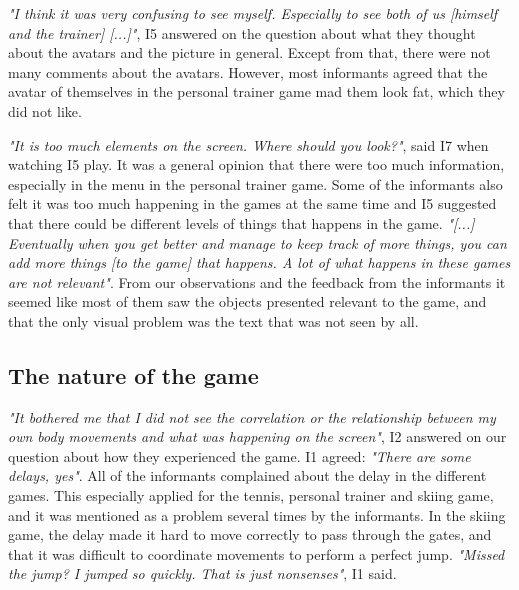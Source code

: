 \emph{"I think it was very confusing to see myself. Especially to see both of us [himself and the trainer] [...]"}, I5 answered on the question about what they thought about the avatars and the picture in general. Except from that, there were not many comments about the avatars. However, most informants agreed that the avatar of themselves in the personal trainer game mad them look fat, which they did not like. 

\emph{"It is too much elements on the screen. Where should you look?"}, said I7 when watching I5 play. It was a general opinion that there were too much information, especially in the menu in the personal trainer game. Some of the informants also felt it was too much happening in the games at the same time and I5 suggested that there could be different levels of things that happens in the game. \emph{"[...] Eventually when you get better and manage to keep track of more things, you can add more things [to the game] that happens. A lot of what happens in these games are not relevant"}. From our observations and the feedback from the informants it seemed like most of them saw the objects presented relevant to the game, and that the only visual problem was the text that was not seen by all.

\subsection{The nature of the game}
\emph{"It bothered me that I did not see the correlation or the relationship between my own body movements and what was happening on the screen"}, I2 answered on our question about how they experienced the game. I1 agreed: \emph{"There are some delays, yes"}. All of the informants complained about the delay in the different games. This especially applied for the tennis, personal trainer and skiing game, and it was mentioned as a problem several times by the informants. In the skiing game, the delay made it hard to move correctly to pass through the gates, and that it was difficult to coordinate movements to perform a perfect jump. \emph{"Missed the jump? I jumped so quickly. That is just nonsenses"}, I1 said. 

